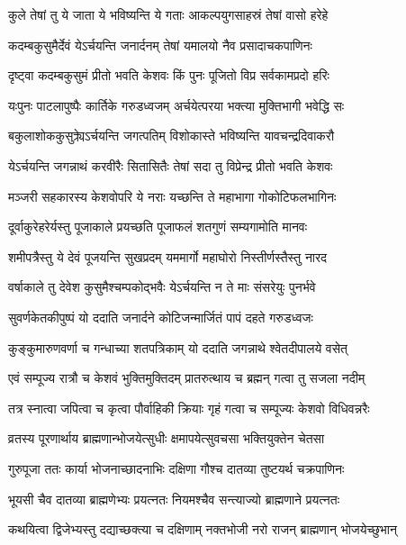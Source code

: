 \twolineshloka
{कुले तेषां तु ये जाता ये भविष्यन्ति ये गताः}
{आकल्पयुगसाहस्रं तेषां वासो हरेहे} %

\twolineshloka
{कदम्बकुसुमैर्देवं येऽर्चयन्ति जनार्दनम्}
{तेषां यमालयो नैव प्रसादाचकपाणिनः} %

\twolineshloka
{दृष्ट्वा कदम्बकुसुमं प्रीतो भवति केशवः}
{किं पुनः पूजितो विप्र सर्वकामप्रदो हरिः} %

\twolineshloka
{यःपुनः पाटलापुष्पैः कार्तिके गरुडध्वजम्}
{अर्चयेत्परया भक्त्या मुक्तिभागी भवेद्धि सः} %

\twolineshloka
{बकुलाशोककुसुक्र्येऽर्चयन्ति जगत्पतिम्}
{विशोकास्ते भविष्यन्ति यावचन्द्रदिवाकरौ} %

\twolineshloka
{येऽर्चयन्ति जगन्नाथं करवीरैः सितासितैः}
{तेषां सदा तु विप्रेन्द्र प्रीतो भवति केशवः} %

\twolineshloka
{मञ्जरी सहकारस्य केशवोपरि ये नराः}
{यच्छन्ति ते महाभागा गोकोटिफलभागिनः} %

\twolineshloka
{दूर्वाकुरेहरेर्यस्तु पूजाकाले प्रयच्छति}
{पूजाफलं शतगुणं सम्यगामोति मानवः} %

\twolineshloka
{शमीपत्रैस्तु ये देवं पूजयन्ति सुखप्रदम्}
{यममार्गो महाघोरो निस्तीर्णस्तैस्तु नारद} %

\twolineshloka
{वर्षाकाले तु देवेश कुसुमैश्चम्पकोद्भवैः}
{येऽर्चयन्ति न ते माः संसरेयुः पुनर्भवे} %

\twolineshloka
{सुवर्णकेतकीपुष्पं यो ददाति जनार्दने}
{कोटिजन्मार्जितं पापं दहते गरुडध्वजः} %

\twolineshloka
{कुङ्कुमारुणवर्णा च गन्धाच्या शतपत्रिकाम्}
{यो ददाति जगन्नाथे श्वेतदीपालये वसेत्} %

\twolineshloka
{एवं सम्पूज्य रात्रौ च केशवं भुक्तिमुक्तिदम्}
{प्रातरुत्थाय च ब्रह्मन् गत्वा तु सजला नदीम्} %

\twolineshloka
{तत्र स्नात्वा जपित्वा च कृत्वा पौर्वाहिकी क्रियाः}
{गृहं गत्वा च सम्पूज्यः केशवो विधिवन्नरैः} %

\twolineshloka
{व्रतस्य पूरणार्थाय ब्राह्मणान्भोजयेत्सुधीः}
{क्षमापयेत्सुवचसा भक्तियुक्तेन चेतसा} %

\twolineshloka
{गुरुपूजा ततः कार्या भोजनाच्छादनाभिः}
{दक्षिणा गौश्च दातव्या तुष्टयर्थ चक्रपाणिनः} %

\twolineshloka
{भूयसी चैव दातव्या ब्राह्मणेभ्यः प्रयत्नतः}
{नियमश्चैव सन्त्याज्यो ब्राह्मणाने प्रयत्नतः} %

\twolineshloka
{कथयित्वा द्विजेभ्यस्तु दद्याच्छक्त्या च दक्षिणाम्}
{नक्तभोजी नरो राजन् ब्राह्मणान् भोजयेच्छुभान्} %

